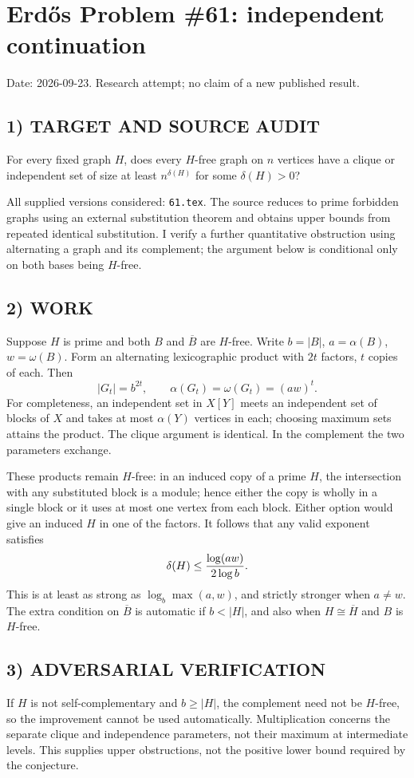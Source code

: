 \section{Erd\H{o}s Problem \#61: independent continuation}
\noindent Date: 2026-09-23. Research attempt; no claim of a new published result.
\subsection{1) TARGET AND SOURCE AUDIT}
For every fixed graph $H$, does every $H$-free graph on $n$ vertices have a clique or independent set of size at least $n^{\delta(H)}$ for some $\delta(H)>0$?

All supplied versions considered: \texttt{61.tex}.
The source reduces to prime forbidden graphs using an external substitution theorem and obtains upper bounds from repeated identical substitution. I verify a further quantitative obstruction using alternating a graph and its complement; the argument below is conditional only on both bases being $H$-free.
\subsection{2) WORK}
Suppose $H$ is prime and both $B$ and $\overline B$ are $H$-free. Write $b=|B|$, $a=\alpha(B)$, $w=\omega(B)$. Form an alternating lexicographic product with $2t$ factors, $t$ copies of each. Then
\[
|G_t|=b^{2t},\qquad \alpha(G_t)=\omega(G_t)=(aw)^t.
\]
For completeness, an independent set in $X[Y]$ meets an independent set of blocks of $X$ and takes at most $\alpha(Y)$ vertices in each; choosing maximum sets attains the product. The clique argument is identical. In the complement the two parameters exchange.

These products remain $H$-free: in an induced copy of a prime $H$, the intersection with any substituted block is a module; hence either the copy is wholly in a single block or it uses at most one vertex from each block. Either option would give an induced $H$ in one of the factors. It follows that any valid exponent satisfies
\[
\delta(H)\le {\log(aw)\over2\log b}.
\]
This is at least as strong as $\log_b\max(a,w)$, and strictly stronger when $a\ne w$. The extra condition on $\overline B$ is automatic if $b<|H|$, and also when $H\cong\overline H$ and $B$ is $H$-free.
\subsection{3) ADVERSARIAL VERIFICATION}
If $H$ is not self-complementary and $b\ge|H|$, the complement need not be $H$-free, so the improvement cannot be used automatically. Multiplication concerns the separate clique and independence parameters, not their maximum at intermediate levels. This supplies upper obstructions, not the positive lower bound required by the conjecture.
